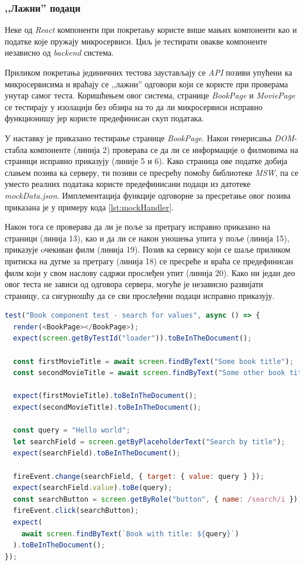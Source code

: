 \documentclass[12pt,oneside]{memoir}
\begin{document}
\subsubsection{,,Лажни” подаци}

Неке од \textit{React} компоненти при покретању користе више мањих компоненти као и податке које пружају микросервиси. Циљ је тестирати овакве компоненте независно од \textit{backend} система.

Приликом покретања јединичних тестова заустављају се \textit{API} позиви упућени ка микросервисима и враћају се ,,лажни” одговори који се користе при проверама унутар самог теста.  Коришћењем овог система, странице \textit{BookPage} и \textit{MoviePage} се тестирају  у изолацији без обзира на то да ли микросервиси исправно функционишу јер користе предефинисан скуп података.

У наставку је приказано тестирање странице \textit{BookPage}. Након генерисања \textit{DOM}-стабла компоненте (линија 2) проверава се да ли се информације о филмовима на страници исправно приказују (линије 5 и 6). Како страница ове податке добија слањем позива ка серверу, ти позиви се пресрећу помоћу библиотеке \textit{MSW}, па се уместо реалних података користе предефинисани подаци из датотеке \textit{mockData.json}. Имплементација функције одговорне за пресретање овог позива приказана је у примеру кода \ref{lst:mockHandler}.

Након тога се проверава да ли је поље за претрагу исправно приказано на страници (линија 13), као и да ли се након уношења упита у поље (линија 15), приказује oчекиван филм (линија 19). Позив ка сервису који се шаље приликом притиска на дугме за претрагу (линија 18) се пресреће и враћа се предефинисан филм који у свом наслову садржи прослеђен упит (линија 20). Како ни један део овог теста не зависи од одговора сервера, могуће је независно развијати страницу, са сигурношћу да се сви прослеђени подаци исправно приказују.


\begin{lstlisting}[caption= Јединично тестирање \textit{BookPage} компоненте,
language=Javascript,
label={lst:componentTest},
frame=single]
test("Book component test - search for values", async () => {
  render(<BookPage></BookPage>);
  expect(screen.getByTestId("loader")).toBeInTheDocument();
  
  const firstMovieTitle = await screen.findByText("Some book title");
  const secondMovieTitle = await screen.findByText("Some other book title");
  
  expect(firstMovieTitle).toBeInTheDocument();
  expect(secondMovieTitle).toBeInTheDocument();

  const query = "Hello world";
  let searchField = screen.getByPlaceholderText("Search by title");
  expect(searchField).toBeInTheDocument();

  fireEvent.change(searchField, { target: { value: query } });
  expect(searchField.value).toBe(query);
  const searchButton = screen.getByRole("button", { name: /search/i });
  fireEvent.click(searchButton);
  expect(
    await screen.findByText(`Book with title: ${query}`)
  ).toBeInTheDocument();
});
\end{lstlisting}
\end{document}
